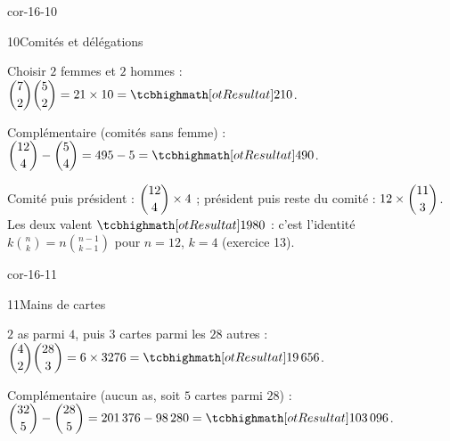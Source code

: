 \begin{blocLivre}{cor-16-10}
\begin{corrige}{10}{Comités et délégations}
\begin{questions}
  \item Choisir $2$ femmes et $2$ hommes :
    $\dbinom72\dbinom52=21\times10=\res{210}$.
  \item Complémentaire (comités sans femme) :
    $\dbinom{12}4-\dbinom54=495-5=\res{490}$.
  \item Comité puis président : $\dbinom{12}4\times4$ ; président puis
    reste du comité : $12\times\dbinom{11}3$. Les deux valent
    $\res{1980}$ : c'est l'identité $k\binom nk=n\binom{n-1}{k-1}$ pour
    $n=12$, $k=4$ (exercice 13).
\end{questions}
\end{corrige}
\end{blocLivre}

\begin{blocLivre}{cor-16-11}
\begin{corrige}{11}{Mains de cartes}
\begin{questions}
  \item $2$ as parmi $4$, puis $3$ cartes parmi les $28$ autres :
    $\dbinom42\dbinom{28}3=6\times3276=\res{19\,656}$.
  \item Complémentaire (aucun as, soit $5$ cartes parmi $28$) :
    $\dbinom{32}5-\dbinom{28}5=201\,376-98\,280=\res{103\,096}$.
\end{questions}
\end{corrige}
\end{blocLivre}

